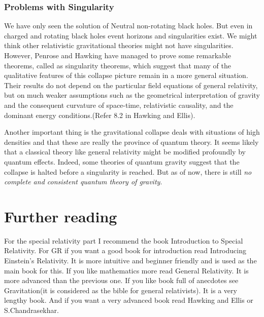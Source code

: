 \documentclass[12pt,a4paper]{article}
\numberwithin{table}{section}
\numberwithin{figure}{section}
\numberwithin{equation}{section}
\theoremstyle{remark}
\theoremstyle{definition}
\begin{document}
\subsubsection{Problems with Singularity}
We have only seen the solution of Neutral non-rotating black holes. But even in charged and rotating black holes event horizons and singularities exist. We might think other relativistic gravitational theories might not have singularities. However, Penrose and Hawking have managed to prove some remarkable theorems, called as singularity theorems, which suggest that many of the qualitative features of this collapse picture remain in a more general situation. Their results do not depend on the particular field equations of general relativity, but on much weaker assumptions such as the geometrical interpretation of gravity and the consequent curvature of space-time, relativistic causality, and the dominant energy conditions.(Refer 8.2 in Hawking and Ellis\cite{hae}).

Another important thing is the gravitational collapse deals with situations of high densities and that these are really the province of quantum theory. It seems likely that a classical theory like general relativity might be modified profoundly by quantum effects. Indeed, some theories of quantum gravity suggest that the collapse is halted before a singularity is reached. But as of now, there is still \textit{no complete and consistent quantum theory of gravity}.
\section*{Further reading}
%
For the special relativity part I recommend the book Introduction to Special Relativity\cite{SR}. For GR if you want a good book for introduction read Introducing Einstein's Relativity\cite{dinv}. It is more intuitive and beginner friendly and is used as the main book for this. If you like mathematics more read General Relativity\cite{wald}. It is more advanced than the previous one.
If you like book full of anecdotes see Gravitation\cite{MTW}(it is considered as the bible for general relativists). It is a very lengthy book. And if you want a very advanced book read Hawking and Ellis\cite{hae} or S.Chandrasekhar\cite{SC}.

\printbibliography
\end{document}
